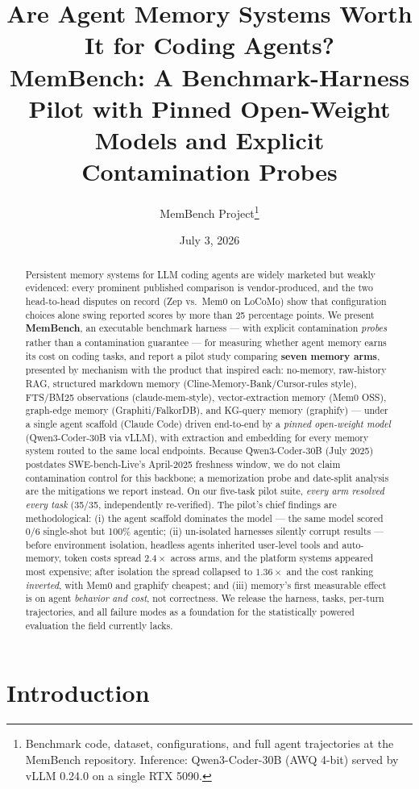 \documentclass[11pt]{article}
\title{Are Agent Memory Systems Worth It for Coding Agents?\\
\large MemBench: A Benchmark-Harness Pilot with Pinned Open-Weight Models and Explicit Contamination Probes}
\author{MemBench Project\thanks{Benchmark code, dataset, configurations, and full agent trajectories at the MemBench repository. Inference: Qwen3-Coder-30B (AWQ 4-bit) served by vLLM 0.24.0 on a single RTX 5090.}}
\date{July 3, 2026}
\begin{document}
\maketitle

\begin{abstract}
Persistent memory systems for LLM coding agents are widely marketed but weakly evidenced: every prominent published comparison is vendor-produced, and the two head-to-head disputes on record (Zep vs.\ Mem0 on LoCoMo) show that configuration choices alone swing reported scores by more than 25 percentage points. We present \textbf{MemBench}, an executable benchmark harness --- with explicit contamination \emph{probes} rather than a contamination guarantee --- for measuring whether agent memory earns its cost on coding tasks, and report a pilot study comparing \textbf{seven memory arms}, presented by mechanism with the product that inspired each: no-memory, raw-history RAG, structured markdown memory (Cline-Memory-Bank/Cursor-rules style), FTS/BM25 observations (claude-mem-style), vector-extraction memory (Mem0 OSS), graph-edge memory (Graphiti/FalkorDB), and KG-query memory (graphify) --- under a single agent scaffold (Claude Code) driven end-to-end by a \emph{pinned open-weight model} (Qwen3-Coder-30B via vLLM), with extraction and embedding for every memory system routed to the same local endpoints. Because Qwen3-Coder-30B (July 2025) postdates SWE-bench-Live's April-2025 freshness window, we do not claim contamination control for this backbone; a memorization probe and date-split analysis are the mitigations we report instead. On our five-task pilot suite, \emph{every arm resolved every task} (35/35, independently re-verified). The pilot's chief findings are methodological: (i) the agent scaffold dominates the model --- the same model scored 0/6 single-shot but 100\% agentic; (ii) un-isolated harnesses silently corrupt results --- before environment isolation, headless agents inherited user-level tools and auto-memory, token costs spread $2.4\times$ across arms, and the platform systems appeared most expensive; after isolation the spread collapsed to $1.36\times$ and the cost ranking \emph{inverted}, with Mem0 and graphify cheapest; and (iii) memory's first measurable effect is on agent \emph{behavior and cost}, not correctness. We release the harness, tasks, per-turn trajectories, and all failure modes as a foundation for the statistically powered evaluation the field currently lacks.
\end{abstract}

\section{Introduction}
\end{document}

